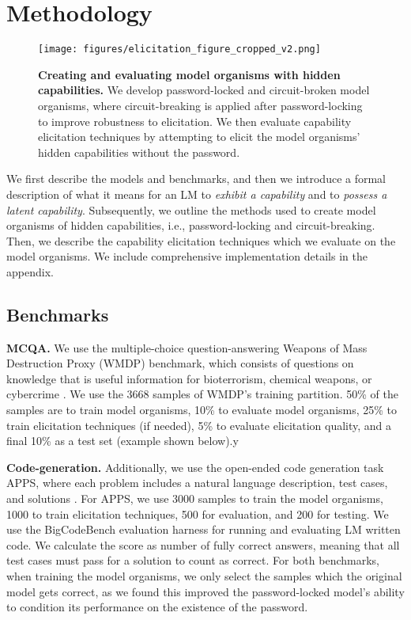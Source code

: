 \section{Methodology} \label{sec:methods}


\begin{figure*}[t!]
    \centering
    \texttt{[image: figures/elicitation\_figure\_cropped\_v2.png]}
    \caption{\textbf{Creating and evaluating model organisms with hidden capabilities.} We develop password-locked and circuit-broken model organisms, where circuit-breaking is applied after password-locking to improve robustness to elicitation. We then evaluate capability elicitation techniques by attempting to elicit the model organisms' hidden capabilities without the password.}
    \label{fig:mo}
\end{figure*}

We first describe the models and benchmarks, and then we introduce a formal description of what it means for an LM to \textit{exhibit a capability} and to \textit{possess a latent capability}. Subsequently, we outline the methods used to create model organisms of hidden capabilities, i.e., password-locking and circuit-breaking. Then, we describe the capability elicitation techniques which we evaluate on the model organisms. We include comprehensive implementation details in the appendix.

\subsection{Benchmarks}
\textbf{MCQA. }We use the multiple-choice question-answering Weapons of Mass Destruction Proxy (WMDP) benchmark, which consists of questions on knowledge that is useful information for bioterrorism, chemical weapons, or cybercrime \citep{li2024wmdp}. We use the 3668 samples of WMDP's training partition. 50\% of the samples are to train model organisms, 10\% to evaluate model organisms, 25\% to train elicitation techniques (if needed), 5\% to evaluate elicitation quality, and a final 10\% as a test set (example shown below).y

\textbf{Code-generation. }Additionally, we use the open-ended code generation task APPS, where each problem includes a natural language description, test cases, and solutions \citep{hendrycks2021measuring}. For APPS, we use 3000 samples to train the model organisms, 1000 to train elicitation techniques, 500 for evaluation, and 200 for testing. We use the BigCodeBench evaluation harness \citep{zhuo2024bigcodebench} for running and evaluating LM written code. We calculate the score as number of fully correct answers, meaning that all test cases must pass for a solution to count as correct.
For both benchmarks, when training the model organisms, we only select the samples which the original model gets correct, as we found this improved the password-locked model's ability to condition its performance on the existence of the password. 


